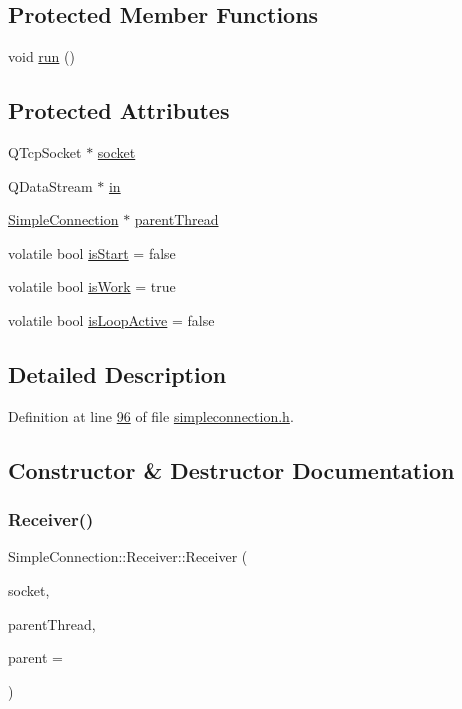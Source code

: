 \subsection*{Protected Member Functions}
\begin{DoxyCompactItemize}
\item 
void \hyperlink{a00133_a8bcc914a839e71786071f655ce5afe7e}{run} ()
\end{DoxyCompactItemize}
\subsection*{Protected Attributes}
\begin{DoxyCompactItemize}
\item 
Q\+Tcp\+Socket $\ast$ \hyperlink{a00133_a2a61dfb0c5aaff07952e9cc933329fe4}{socket}
\item 
Q\+Data\+Stream $\ast$ \hyperlink{a00133_aa4c39c627b02662a6f68885aa8fca85b}{in}
\item 
\hyperlink{a00125}{Simple\+Connection} $\ast$ \hyperlink{a00133_a86812570e3dd426878732f5ea4ae3b9e}{parent\+Thread}
\item 
volatile bool \hyperlink{a00133_ac47df189e93600b9bda2e1dca4e092c9}{is\+Start} = false
\item 
volatile bool \hyperlink{a00133_acc9d38bc97267217323908d6aaae5972}{is\+Work} = true
\item 
volatile bool \hyperlink{a00133_a7ed726c394f5e48761a19ccecc988173}{is\+Loop\+Active} = false
\end{DoxyCompactItemize}


\subsection{Detailed Description}


Definition at line \hyperlink{a00008_source_l00096}{96} of file \hyperlink{a00008_source}{simpleconnection.\+h}.



\subsection{Constructor \& Destructor Documentation}
\mbox{\label{a00133_a188daa54b2ed047298df6b889dad5004}} 
\subsubsection{\texorpdfstring{Receiver()}{Receiver()}}
{\footnotesize\ttfamily Simple\+Connection\+::\+Receiver\+::\+Receiver (\begin{DoxyParamCaption}\item[{Q\+Tcp\+Socket $\ast$}]{socket,  }\item[{\hyperlink{a00125}{Simple\+Connection} $\ast$}]{parent\+Thread,  }\item[{Q\+Object $\ast$}]{parent = {} }\end{DoxyParamCaption})}



